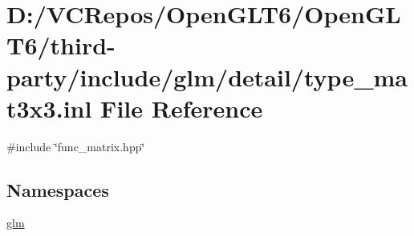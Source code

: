 \hypertarget{type__mat3x3_8inl}{}\section{D\+:/\+V\+C\+Repos/\+Open\+G\+L\+T6/\+Open\+G\+L\+T6/third-\/party/include/glm/detail/type\+\_\+mat3x3.inl File Reference}
\label{type__mat3x3_8inl}
{\ttfamily \#include \char`\"{}func\+\_\+matrix.\+hpp\char`\"{}}\newline
\subsection*{Namespaces}
\begin{DoxyCompactItemize}
\item 
 \mbox{\hyperlink{namespaceglm}{glm}}
\end{DoxyCompactItemize}
